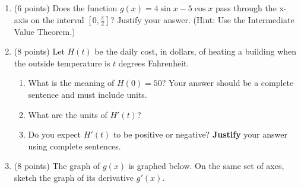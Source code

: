 \documentclass[12pt]{article}
\begin{document}
\begin{enumerate}
%

\item (6 points) Does the function $g(x)=4\sin x - 5\cos x$ pass through the x-axis on the interval $[0,\frac{\pi}{2}]$? Justify your answer. (Hint: Use the Intermediate Value Theorem.)

\vfill
\newpage


\item (8 points) Let $H(t)$ be the daily cost, in dollars, of heating a building when the outside temperature is $t$ degrees Fahrenheit.

	\begin{enumerate}

	\item What is the meaning of $H(0)=50$? Your answer should be a complete sentence and must include units.

	\vspace{.6in}

	\item What are the units of $H'(t)$?
	\vspace{.5in}

	\item Do you expect $H'(t)$ to be positive or negative? \textbf{Justify} your answer using complete sentences. 
\vfill
	\end{enumerate}


\item (8 points) The graph of $g(x)$ is graphed below. On the same set of axes, sketch the graph of its derivative $g'(x)$.

\begin{center}
 \end{center}


\end{enumerate}
\end{document}
